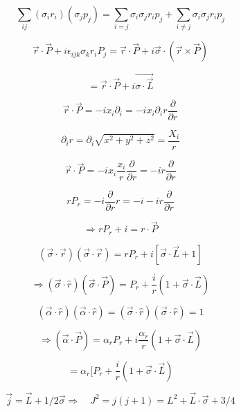 \documentclass{report}
\begin{document}
\[\sum_{ij} (\sigma_i r_i )(\sigma_j p_j ) = \sum _{i=j} \sigma_i \sigma_j r_i p_j + \sum_{i \neq j} \sigma_i \sigma_j r_i p_j\]

\[\overrightarrow{r} \cdot \overrightarrow{P} + i \epsilon_{ijk} \sigma_k r_i P_j = \overrightarrow{r} \cdot \overrightarrow{P} + i \overrightarrow{\sigma} \cdot (\overrightarrow{r} \times \overrightarrow{P})\]

\[= \overrightarrow{r} \cdot \overrightarrow{P} + i \overrightarrow{\sigma \cdot \overrightarrow{L}}\]

\begin{equation}
\overrightarrow{r} \cdot \overrightarrow{P} = -i x_i \partial_i = -i x_i \partial_i r \frac{\partial}{\partial r}
\end{equation}

\[\partial_i r = \partial_i \sqrt{x^2 + y^2 + z^2} = \frac{X_i}{r}\]

\[\overrightarrow{r} \cdot \overrightarrow{P} = - i x_i \frac{x_i }{r} \frac{\partial}{\partial r} = -i r \frac{\partial}{\partial r}\]

\begin{equation}
r P_r = - i \frac{\partial}{\partial r} r = -i -ir \frac{\partial}{\partial r}
\end{equation}

\[\Rightarrow r P_r + i = r \cdot \overrightarrow{P}\]

\[(\overrightarrow{\sigma} \cdot \overrightarrow{r}) (\overrightarrow{\sigma} \cdot \overrightarrow{r}) = r P_r + i [\overrightarrow{\sigma} \cdot \overrightarrow{L}+1]\]

\[\Rightarrow (\overrightarrow{\sigma} \cdot \hat{r}) (\overrightarrow{\sigma} \cdot \overrightarrow{P}) = P_r + \frac{i}{r} (1+ \overrightarrow{\sigma} \cdot \overrightarrow{L})\]

\[(\overrightarrow{\alpha} \cdot \hat{r}) (\overrightarrow{\alpha} \cdot \hat{r}) = (\overrightarrow{\sigma} \cdot \hat{r}) (\overrightarrow{\sigma} \cdot \hat{r}) = 1\]

\[\Rightarrow (\overrightarrow{\alpha} \cdot \overrightarrow{P}) = \alpha_r P_r + i \frac{\alpha _r}{r} (1+\overrightarrow{\sigma} \cdot \overrightarrow{L})\]

\[= \alpha_r [P_r + \frac{i}{r} (1+ \overrightarrow{\sigma} \cdot \overrightarrow{L})\]

\[\overrightarrow{j} = \overrightarrow{L} + 1/2 \overrightarrow{\sigma} \Rightarrow \quad J^2 = j(j+1) = L^2 + \overrightarrow{L} \cdot \overrightarrow{\sigma} + 3/4\]
\end{document}
